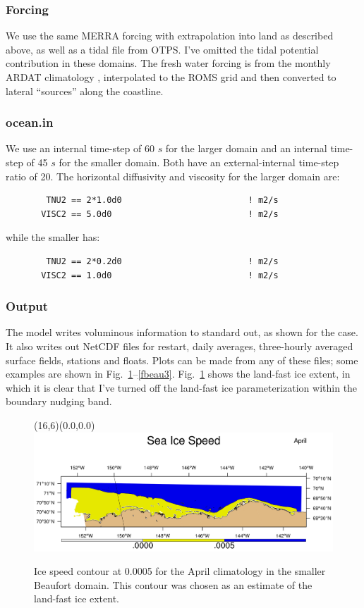 \subsubsection{Forcing}
We use the same MERRA forcing with extrapolation into land as
described above, as well as a tidal file from OTPS. I've omitted
the tidal potential contribution in these domains. The fresh water
forcing is from the monthly ARDAT climatology \citep{Whitefield_2015},
interpolated to the ROMS grid and then converted to lateral ``sources''
along the coastline.

\subsubsection{ocean.in}
We use an internal time-step of 60 $s$ for the larger domain and an internal time-step of 45 $s$ for
the smaller domain. Both have an external-internal time-step ratio of 20.
The horizontal diffusivity and viscosity for the larger domain are:
\begin{verbatim}
        TNU2 == 2*1.0d0                         ! m2/s
       VISC2 == 5.0d0                           ! m2/s
\end{verbatim}
while the smaller has:
\begin{verbatim}
        TNU2 == 2*0.2d0                         ! m2/s
       VISC2 == 1.0d0                           ! m2/s
\end{verbatim}

\subsubsection{Output}
The model writes voluminous information to standard out, as shown
for the  case. It also writes out NetCDF files for
restart, daily averages, three-hourly averaged surface fields,
stations and floats.  Plots can be made from any of these files;
some examples are shown in Fig.\ \ref{fbeau1}--\ref{fbeau3}.  Fig.\
\ref{fbeau1} shows the land-fast ice extent, in which it is clear
that I've turned off the land-fast ice parameterization within the
boundary nudging band.

\begin{figure}
\setlength{\unitlength}{10 mm}
\begin{picture}(16,6)(0.0,0.0)
\includegraphics[width=16cm]{pics/ice_vel_beau}
  \end{picture}
\caption{Ice speed contour at 0.0005 for the April climatology in
  the smaller Beaufort domain. This contour was chosen as an estimate
  of the land-fast ice extent.}
\label{fbeau1}
\end{figure}

